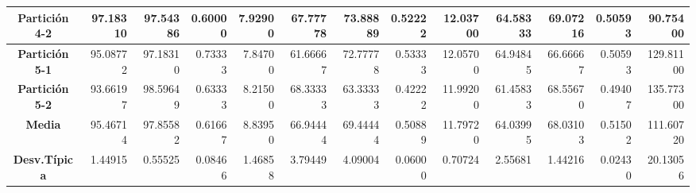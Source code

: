 \documentclass[a4paper,11pt]{article}
\begin{document}
\begin{table}[H]
\begin{adjustbox}{width=1.1\textwidth}
\begin{tabular}{|c|r|r|r|r|r|r|r|r|r|r|r|r|}
  \textbf{Partición 4-2} & 97.18310 & 97.54386 & 0.60000 & 7.92900 & 67.77778 & 73.88889 & 0.52222 & 12.03700 & 64.58333 & 69.07216 & 0.50593 & 90.75400 \\ \hline
  \textbf{Partición 5-1} & 95.08772 & 97.18310 & 0.73333 & 7.84700 & 61.66667 & 72.77778 & 0.53333 & 12.05700 & 64.94845 & 66.66667 & 0.50593 & 129.81100 \\ \hline
  \textbf{Partición 5-2} & 93.66197 & 98.59649 & 0.63333 & 8.21500 & 68.33333 & 63.33333 & 0.42222 & 11.99200 & 61.45833 & 68.55670 & 0.49407 & 135.77300 \\ \hline
  \textbf{Media} & 95.46714 & 97.85582 & 0.61667 & 8.83950 & 66.94444 & 69.44444 & 0.50889 & 11.79720 & 64.03995 & 68.03103 & 0.51502 & 111.60720 \\ \hline
  \textbf{Desv.Típica} & 1.44915 & 0.55525 & 0.08466 & 1.46858 & 3.79449 & 4.09004 & 0.06000 & 0.70724 & 2.55681 & 1.44216 & 0.02430 & 20.13056 \\ \hline
  \end{tabular}
  \end{adjustbox}
  \label{}
  \end{table}
  
\end{document}
